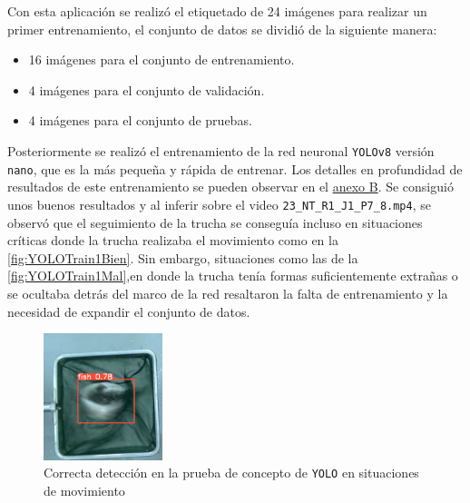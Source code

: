 Con esta aplicación se realizó el etiquetado de 24 imágenes para realizar un primer entrenamiento, el conjunto de datos se dividió de la siguiente manera:
\begin{itemize}
    \item 16 imágenes para el conjunto de entrenamiento.
    \item 4 imágenes para el conjunto de validación.
    \item 4 imágenes para el conjunto de pruebas.
\end{itemize}

Posteriormente se realizó el entrenamiento de la red neuronal \texttt{YOLOv8} versión \texttt{nano}, que es la más pequeña y rápida de entrenar. Los detalles en profundidad de resultados de este 
entrenamiento se pueden observar en el \hyperref[train:1]{anexo B}. \newline
Se consiguió unos buenos resultados y al inferir sobre el video \verb|23_NT_R1_J1_P7_8.mp4|, se observó que el seguimiento de la trucha se conseguía incluso en situaciones críticas donde la trucha realizaba 
el movimiento como en la \autoref{fig:YOLOTrain1Bien}. Sin embargo, situaciones como las de la \autoref{fig:YOLOTrain1Mal},en donde la trucha tenía formas suficientemente extrañas o se ocultaba detrás del marco de la red resaltaron la falta de entrenamiento y la 
necesidad de expandir el conjunto de datos.
\begin{figure}[H]
    \centering
    \includegraphics[width=0.31\textwidth]{images/6/6.2.2/DeteccionTrain1.png}
    \caption{Correcta detección en la prueba de concepto de \texttt{YOLO} en situaciones de movimiento}
    \label{fig:YOLOTrain1Bien}
\end{figure}

